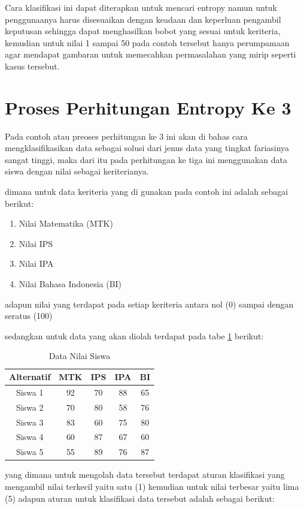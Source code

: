 Cara klasifikasi ini dapat diterapkan untuk mencari entropy namun untuk penggunaanya harus disesuaikan dengan keadaan dan keperluan pengambil keputusan sehingga dapat menghasilkan bobot yang sesuai untuk keriteria, kemudian untuk nilai 1 sampai 50 pada contoh tersebut hanya perumpamaan agar mendapat gambaran untuk memecahkan permasalahan yang mirip seperti kasus tersebut.
\pagebreak
\section{Proses Perhitungan Entropy Ke 3}

Pada contoh atau preoses perhitungan ke 3 ini akan di bahas cara mengklasifikasikan data sebagai solusi dari jenus data yang tingkat fariasinya sangat tinggi, maka dari itu pada perhitungan ke tiga ini menggunakan data siswa dengan nilai sebagai keriterianya.

dimana untuk data keriteria yang di gunakan pada contoh ini adalah sebagai berikut:

\begin{enumerate}
\item Nilai Matematika (MTK)
\item Nilai IPS
\item Nilai IPA
\item Nilai Bahasa Indonesia (BI)
\end{enumerate}

adapun nilai yang terdapat pada setiap keriteria antara nol (0) sampai dengan seratus (100)\par

sedangkan untuk data yang akan diolah terdapat pada tabe \ref{ts1} berikut:

\begin{table}[h]
\caption{Data Nilai Siswa}
\centering
\begin{tabular}{|c|c|c|c|c|}
\hline
Alternatif & MTK & IPS & IPA&BI\\
\hline
Siswa 1 &92 & 70 & 88 &  65\\
\hline
Siswa 2 &70 & 80 & 58 &  76\\
\hline
Siswa 3 &83 & 60 & 75 &  80\\
\hline
Siswa 4 &60 & 87 & 67 &  60\\
\hline
Siswa 5 &55 & 89 & 76 &  87\\
\hline

\end{tabular}
\label{ts1}
\end{table}

yang dimana untuk mengolah data tersebut terdapat aturan klasifikasi yang mengambil nilai terkecil yaitu satu (1) kemudian untuk nilai terbesar yaitu lima (5) adapun aturan untuk klasifikasi data tersebut adalah sebagai berikut:

